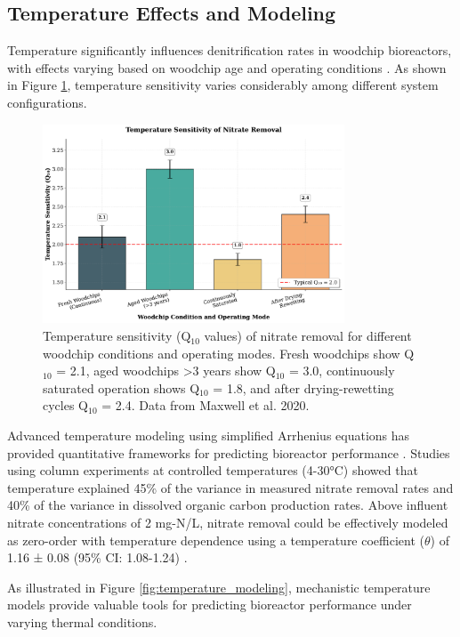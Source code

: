 \documentclass[12pt,a4paper]{article}
\begin{document}
\subsection{Temperature Effects and Modeling}

Temperature significantly influences denitrification rates in woodchip bioreactors, with effects varying based on woodchip age and operating conditions \citep{RN228, RN242}. As shown in Figure \ref{fig:temperature_sensitivity}, temperature sensitivity varies considerably among different system configurations.

\begin{figure}[ht]
\centering
\includegraphics[width=0.8\textwidth]{fig4_temperature_scientific}
\caption{Temperature sensitivity (Q$_{10}$ values) of nitrate removal for different woodchip conditions and operating modes. Fresh woodchips show Q$_{10}$ = 2.1, aged woodchips >3 years show Q$_{10}$ = 3.0, continuously saturated operation shows Q$_{10}$ = 1.8, and after drying-rewetting cycles Q$_{10}$ = 2.4. Data from Maxwell et al. 2020.}
\label{fig:temperature_sensitivity}
\end{figure}

Advanced temperature modeling using simplified Arrhenius equations has provided quantitative frameworks for predicting bioreactor performance \citep{RN242}. Studies using column experiments at controlled temperatures (4-30°C) showed that temperature explained 45\% of the variance in measured nitrate removal rates and 40\% of the variance in dissolved organic carbon production rates. Above influent nitrate concentrations of 2 mg-N/L, nitrate removal could be effectively modeled as zero-order with temperature dependence using a temperature coefficient ($\theta$) of 1.16 ± 0.08 (95\% CI: 1.08-1.24) \citep{RN242}.

As illustrated in Figure \ref{fig:temperature_modeling}, mechanistic temperature models provide valuable tools for predicting bioreactor performance under varying thermal conditions.
\end{document}

